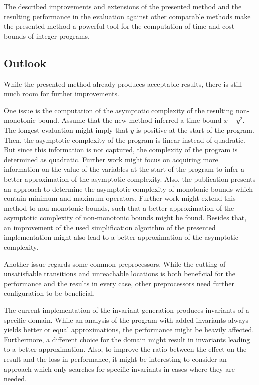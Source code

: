 The described improvements and extensions of the presented method and the resulting performance in the evaluation against other comparable methods make the presented method a powerful tool for the computation of time and cost bounds of integer programs.

\subsection{Outlook}

While the presented method already produces acceptable results, there is still much room for further improvements.

One issue is the computation of the asymptotic complexity of the resulting non-monotonic bound.
Assume that the new method inferred a time bound $x-y^2$.
The longest evaluation might imply that $y$ is positive at the start of the program.
Then, the asymptotic complexity of the program is linear instead of quadratic.
But since this information is not captured, the complexity of the program is determined as quadratic.
Further work might focus on acquiring more information on the value of the variables at the start of the program to infer a better approximation of the asymptotic complexity.
Also, the publication \cite{albert2009asymptotic} presents an approach to determine the asymptotic complexity of monotonic bounds which contain minimum and maximum operators.
Further work might extend this method to non-monotonic bounds, such that a better approximation of the asymptotic complexity of non-monotonic bounds might be found.
Besides that, an improvement of the used simplification algorithm of the presented implementation might also lead to a better approximation of the asymptotic complexity.

Another issue regards some common preprocessors.
While the cutting of unsatisfiable transitions and unreachable locations is both beneficial for the performance and the results in every case, other preprocessors need further configuration to be beneficial.

The current implementation of the invariant generation produces invariants of a specific domain.
While an analysis of the program with added invariants always yields better or equal approximations, the performance might be heavily affected.
Furthermore, a different choice for the domain might result in invariants leading to a better approximation.
Also, to improve the ratio between the effect on the result and the loss in performance, it might be interesting to consider an approach which only searches for specific invariants in cases where they are needed.

